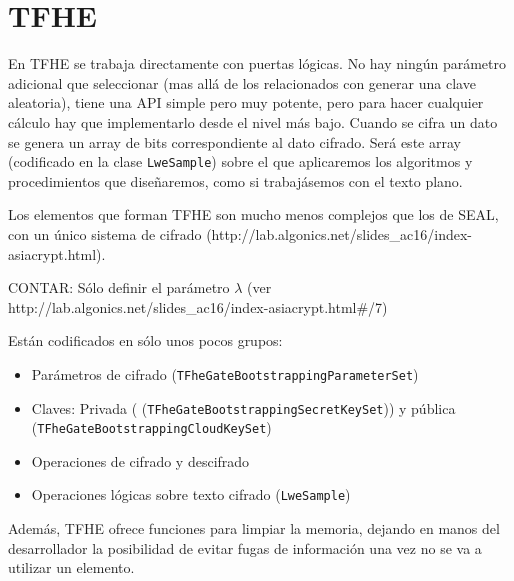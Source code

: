 %
%
%
%
%
%
%


\section{TFHE}

En TFHE se trabaja directamente con puertas lógicas. No hay ningún parámetro adicional que seleccionar (mas allá de los relacionados con generar una clave aleatoria), tiene una API simple pero muy potente, pero para hacer cualquier cálculo hay que implementarlo desde el nivel más bajo. Cuando se cifra un dato se genera un array de bits correspondiente al dato cifrado. Será este array (codificado en la clase \verb|LweSample|) sobre el que aplicaremos los algoritmos y procedimientos que diseñaremos, como si trabajásemos con el texto plano.

Los elementos que forman TFHE son mucho menos complejos que los de SEAL, con un único sistema de cifrado (http://lab.algonics.net/slides_ac16/index-asiacrypt.html).

CONTAR: Sólo definir el parámetro $\lambda$ (ver http://lab.algonics.net/slides_ac16/index-asiacrypt.html#/7)

Están codificados en sólo unos pocos grupos:

\begin{itemize}
  \item Parámetros de cifrado (\texttt{TFheGateBootstrappingParameterSet})
  \item Claves: Privada ( (\texttt{TFheGateBootstrappingSecretKeySet})) y pública (\texttt{TFheGateBootstrappingCloudKeySet})
  \item Operaciones de cifrado y descifrado
  \item Operaciones lógicas sobre texto cifrado (\texttt{LweSample})
\end{itemize}

Además, TFHE ofrece funciones para limpiar la memoria, dejando en manos del desarrollador la posibilidad de evitar fugas de información una vez no se va a utilizar un elemento.

